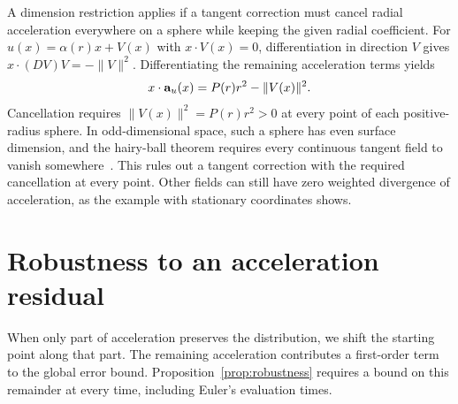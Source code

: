 A dimension restriction applies if a tangent correction must cancel radial acceleration everywhere on a sphere while keeping the given radial coefficient. For $u(x)=\alpha(r)x+V(x)$ with $x\cdot V(x)=0$, differentiation in direction $V$ gives $x\cdot(DV)V=-\|V\|^2$. Differentiating the remaining acceleration terms yields
\[
 x\cdot\mathbf a_u(x)=P(r)r^2-\|V(x)\|^2.
\]
Cancellation requires $\|V(x)\|^2=P(r)r^2>0$ at every point of each positive-radius sphere. In odd-dimensional space, such a sphere has even surface dimension, and the hairy-ball theorem requires every continuous tangent field to vanish somewhere~\citep[Theorem~2.28]{hatcher2002algebraic}. This rules out a tangent correction with the required cancellation at every point. Other fields can still have zero weighted divergence of acceleration, as the example with stationary coordinates shows.

\section{Robustness to an acceleration residual}
\label{app:robustness}

When only part of acceleration preserves the distribution, we shift the starting point along that part. The remaining acceleration contributes a first-order term to the global error bound. Proposition~\ref{prop:robustness} requires a bound on this remainder at every time, including Euler's evaluation times.

